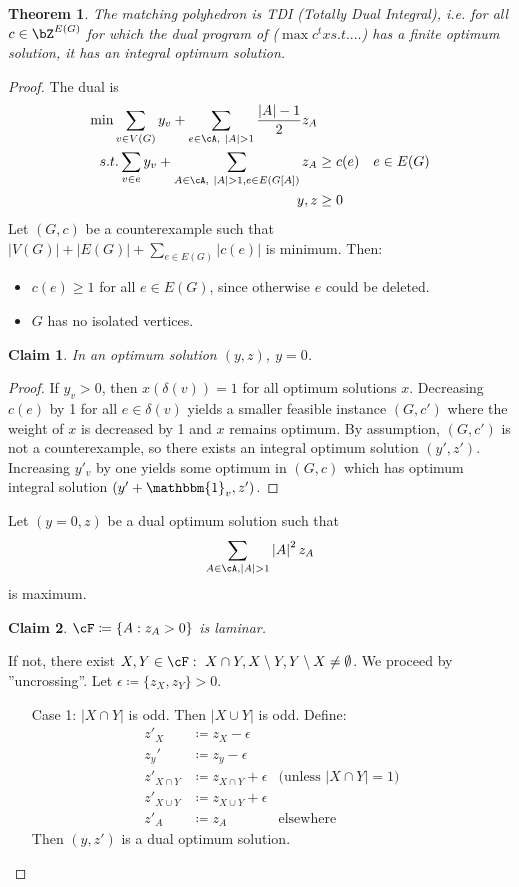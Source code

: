 \documentclass[11pt, a4paper]{article}
\newcommand{\abs}[1]{\left\lvert#1\right\rvert}
\newcommand{\set}[1]{\{#1\}}
\newtheorem{theorem}{Theorem}[section]
\newtheorem*{claim}{Claim}
\theoremstyle{remark}
\theoremstyle{definition}
\begin{document}
\begin{theorem}
	The matching polyhedron is TDI (Totally Dual Integral), i.e. for all
	$c\in \bZ^{E(G)}$ for which the dual program of ($\max c^tx s.t.\ldots$)
	has a finite optimum solution, it has an integral optimum solution.
\end{theorem}
\begin{proof}
The dual is
\begin{align*}
	\min \sum_{v\in V(G)}y_v+\sum_{e\in\cA,\ \abs{A}>1}\frac{\abs{A}-1}{2}z_A \\
	s.t.\sum_{v\in e}y_v
		+\sum_{A\in\cA,\ \abs{A}>1,e\in E(G[A])}z_A&\geq c(e) &e\in E(G) \\
	y,z&\geq0
\end{align*}
Let $(G,c)$ be a counterexample such that  $\abs{V(G)}+\abs{E(G)}+
\sum_{e\in E(G)}\abs{c(e)}$ is minimum. Then:
\begin{itemize}
	\item $c(e)\geq 1$ for all
	$e\in E(G)$, since otherwise $e$ could be deleted. 
	\item $G$ has no isolated vertices.
\end{itemize}
\begin{claim}
In an optimum solution $(y,z)$, $y=0$.
\end{claim}
\begin{proof}
If $y_v>0$, then $x(\delta(v))=1$ for all optimum solutions $x$. Decreasing
$c(e)$ by 1 for all $e\in\delta(v)$ yields a smaller feasible instance
$(G,c')$ where the weight of $x$ is decreased by 1 and $x$ remains optimum.
By assumption, $(G,c')$ is not a counterexample, so there exists an integral
optimum solution $(y',z')$. Increasing $y'_v$ by one yields some optimum
in $(G,c)$ which has optimum integral solution $(y'+\mathbbm{1}_v,z')$.
\end{proof}

Let $(y=0,z)$ be a dual optimum solution such that 
\[\sum_{A\in\cA, \abs{A}>1} \abs{A}^2z_A\]
is maximum.
\begin{claim}
$\cF\coloneqq\set{A: z_A>0}$ is laminar.
\end{claim}
If not, there exist $X,Y\in\cF:\ X\cap Y,X\setminus Y,Y\setminus X\neq\emptyset$.
We proceed by ''uncrossing''. Let $\epsilon\coloneqq \set{z_X,z_Y}>0$.
\begin{enumerate}
	\item[Case 1:] $\abs{X\cap Y}$ is odd. Then $\abs{X\cup Y}$ is odd.
	Define:
	\begin{align*}
	z'_X&\coloneqq z_X-\epsilon \\
	z_y'&\coloneqq z_y-\epsilon \\
	z'_{X\cap Y}&\coloneqq z_{X\cap Y}+\epsilon &\text{(unless $\abs{X\cap Y}=1$)} \\
	z'_{X\cup Y}&\coloneqq z_{X\cup Y}+\epsilon \\
	z'_A&\coloneqq z_A &\text{elsewhere}
	\end{align*}
	Then $(y,z')$ is a dual optimum solution.
	

\end{enumerate}
\end{proof}
\end{document}
